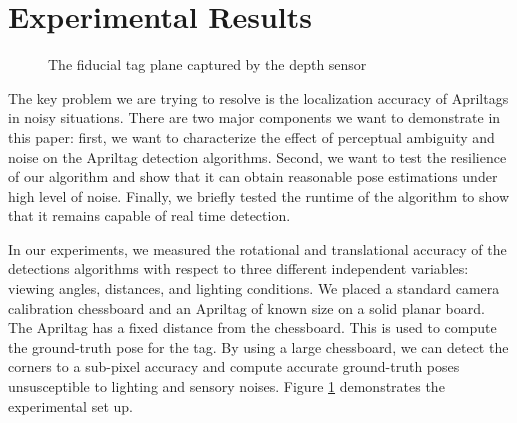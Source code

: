 \section{Experimental Results}

\begin{figure}[h]
\centering
{}
\caption{The fiducial tag plane captured by the depth sensor}
\label{fig:exp_setup}
\end{figure}

\label{sec:res}
The key problem we are trying to resolve is the localization accuracy of Apriltags in noisy situations. There are two major components we want to demonstrate in this paper: first, we want to characterize the effect of perceptual ambiguity and noise on the Apriltag detection algorithms. Second, we want to test the resilience of our algorithm and show that it can obtain reasonable pose estimations under high level of noise. Finally, we briefly tested the runtime of the algorithm to show that it remains capable of real time detection. 

In our experiments, we measured the rotational and translational accuracy of the detections algorithms with respect to three different independent variables: viewing angles, distances, and lighting conditions. We placed a standard camera calibration chessboard and an Apriltag of known size on a solid planar board. The Apriltag has a fixed distance from the chessboard. This is used to compute the ground-truth pose for the tag. By using a large chessboard, we can detect the corners to a sub-pixel accuracy and compute accurate ground-truth poses unsusceptible to lighting and sensory noises. Figure \ref{fig:exp_setup} demonstrates the experimental set up. 

